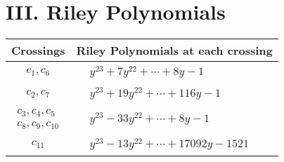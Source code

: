 \documentclass[1p]{elsarticle_modified}
\theoremstyle{definition}
\begin{document}
\centering \section*{ III. Riley Polynomials}
\begin{tabular}{m{50pt}|m{274pt}}
Crossings & \hspace{64pt}Riley Polynomials at each crossing \\
\hline $$\begin{aligned}c_{1},c_{6}\end{aligned}$$&$\begin{aligned}
&y^{23}+7 y^{22}+\cdots+8 y-1
\end{aligned}$\\
\hline $$\begin{aligned}c_{2},c_{7}\end{aligned}$$&$\begin{aligned}
&y^{23}+19 y^{22}+\cdots+116 y-1
\end{aligned}$\\
\hline $$\begin{aligned}c_{3},c_{4},c_{5}\\c_{8},c_{9},c_{10}\end{aligned}$$&$\begin{aligned}
&y^{23}-33 y^{22}+\cdots+8 y-1
\end{aligned}$\\
\hline $$\begin{aligned}c_{11}\end{aligned}$$&$\begin{aligned}
&y^{23}-13 y^{22}+\cdots+17092 y-1521
\end{aligned}$\\
\hline
\end{tabular}
\vskip 2pc
\end{document}
